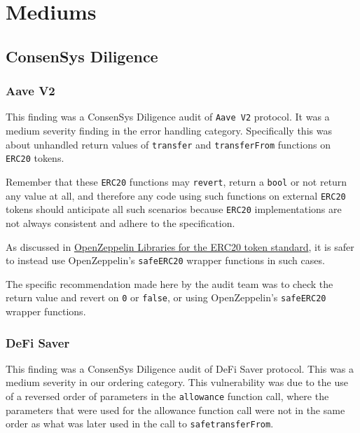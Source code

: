 \section{Mediums}\label{mediums}

\subsection{ConsenSys Diligence}\label{consensys-diligence}

\subsubsection{Aave V2}\label{aave-v2}

This finding was a ConsenSys Diligence audit of \texttt{Aave\ V2}
protocol. It was a medium severity finding in the error handling
category. Specifically this was about unhandled return values of
\texttt{transfer} and \texttt{transferFrom} functions on \texttt{ERC20}
tokens.

Remember that these \texttt{ERC20} functions may \texttt{revert}, return
a \texttt{bool} or not return any value at all, and therefore any code
using such functions on external \texttt{ERC20} tokens should anticipate
all such scenarios because \texttt{ERC20} implementations are not always
consistent and adhere to the specification.

As discussed in
\href{../2.Solidity/2.28_Open_Zeppelin_Libraries.md\#ERC20}{OpenZeppelin
Libraries for the ERC20 token standard}, it is safer to instead use
OpenZeppelin's \texttt{safeERC20} wrapper functions in such cases.

The specific recommendation made here by the audit team was to check the
return value and revert on \texttt{0} or \texttt{false}, or using
OpenZeppelin's \texttt{safeERC20} wrapper functions.

\subsubsection{DeFi Saver}\label{defi-saver}

This finding was a ConsenSys Diligence audit of DeFi Saver protocol.
This was a medium severity in our ordering category. This vulnerability
was due to the use of a reversed order of parameters in the
\texttt{allowance} function call, where the parameters that were used
for the allowance function call were not in the same order as what was
later used in the call to \texttt{safetransferFrom}.

